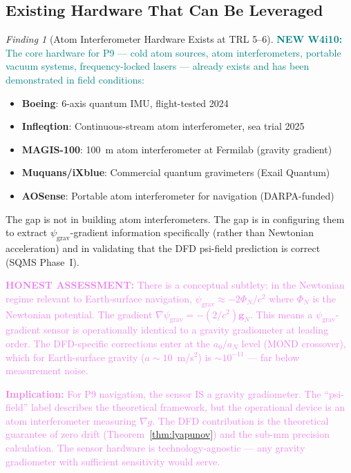 \documentclass[11pt]{article}
\theoremstyle{definition}
\theoremstyle{remark}
\newtheorem{finding}[theorem]{Finding}
\newcommand{\psigrav}{\psi_{\mathrm{grav}}}
\newcommand{\honest}[1]{\textcolor{violet}{\textbf{HONEST ASSESSMENT:} #1}}
\newcommand{\newfinding}[1]{\textcolor{teal}{\textbf{NEW W4i10:} #1}}
\begin{document}
\subsection{Existing Hardware That Can Be Leveraged}

\begin{finding}[Atom Interferometer Hardware Exists at TRL 5--6]
\label{find:existing-hw}
\newfinding{The core hardware for P9 --- cold atom sources, atom interferometers,
portable vacuum systems, frequency-locked lasers --- already exists and has been
demonstrated in field conditions:}
\begin{itemize}[nosep]
\item \textbf{Boeing}: 6-axis quantum IMU, flight-tested 2024
\item \textbf{Infleqtion}: Continuous-stream atom interferometer, sea trial 2025
\item \textbf{MAGIS-100}: 100~m atom interferometer at Fermilab (gravity gradient)
\item \textbf{Muquans/iXblue}: Commercial quantum gravimeters (Exail Quantum)
\item \textbf{AOSense}: Portable atom interferometer for navigation (DARPA-funded)
\end{itemize}

The gap is not in building atom interferometers. The gap is in configuring them
to extract $\psigrav$-gradient information specifically (rather than Newtonian
acceleration) and in validating that the DFD psi-field prediction is correct
(SQMS Phase~I).
\end{finding}

\honest{There is a conceptual subtlety: in the Newtonian regime relevant to
Earth-surface navigation, $\psigrav \approx -2\Phi_N/c^2$ where $\Phi_N$ is the
Newtonian potential. The gradient $\nabla\psigrav = -(2/c^2)\mathbf{g}_N$.
This means a $\psigrav$-gradient sensor is operationally identical to a gravity
gradiometer at leading order. The DFD-specific corrections enter at the
$a_0/a_N$ level (MOND crossover), which for Earth-surface gravity ($a \sim 10$~m/s$^2$)
is $\sim 10^{-11}$ --- far below measurement noise.

\textbf{Implication:} For P9 navigation, the sensor IS a gravity gradiometer.
The ``psi-field'' label describes the theoretical framework, but the operational
device is an atom interferometer measuring $\nabla g$. The DFD contribution is
the theoretical guarantee of zero drift (Theorem~\ref{thm:lyapunov}) and the
sub-mm precision calculation. The sensor hardware is technology-agnostic ---
any gravity gradiometer with sufficient sensitivity would serve.}
\end{document}
